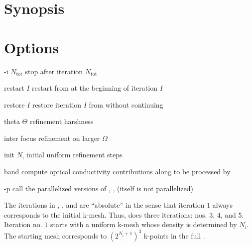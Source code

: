 \FloatBarrier
\section{Synopsis}
\label{sec:woprog:usage}

\newcommand\Ntot{$N_\text{tot}$\xspace}
\newcommand\NI{\ensuremath{N_\text{i}}\xspace}

\begin{usage}
  \woprog [-i \Ntot] [\td{}restart $I$] [\codeit{more options}]
\end{usage}


\section{Options}

\begin{options}
\item [-i \Ntot] stop after iteration \Ntot{} 

\item [\td{}restart $I$] restart from \wophist at the beginning of
  iteration $I$ 

\item [\td{}restore $I$] restore iteration $I$ from \wophist without
  continuing

\item [\td{}theta $Θ$] refinement harshness 

\item [\td{}inter] focus refinement on larger $Ω$

\item [\td{}init \NI] initial uniform refinement steps  \label{woprog:init}

\item [\lvir\td{}band] compute optical conductivity contributions along
   to be processed by \kanalysis

\item[-p] call the parallelized versions of \lapwi, \lapwso, \optic
  (\woptic itself is not parallelized)
\end{options}
%
The iterations in , , and
 are ``absolute'' in the sense that iteration $1$
always corresponds to the initial k-mesh.  Thus,  does three iterations: nos. $3$, $4$, and $5$.
Iteration no. $1$ starts with a uniform k-mesh whose density is
determined by \NI.  The starting mesh corresponds to $(2^{\NI+1})^3$
k-points in the full \bz.

